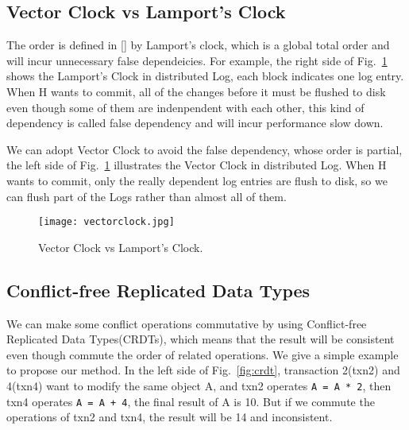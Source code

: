 \subsection{Vector Clock vs Lamport's Clock}
The order is defined in [] by Lamport's clock, which is a global total order and will incur unnecessary false dependeicies. For example, the right side of Fig.~\ref{fig:vectorclock} shows the Lamport's Clock in distributed Log, each block indicates one log entry. When H wants to commit, all of the changes before it must be flushed to disk even though some of them are indenpendent with each other, this kind of dependency is called false dependency and will incur performance slow down.

We can adopt Vector Clock to avoid the false dependency, whose order is partial, the left side of Fig.~\ref{fig:vectorclock} illustrates the Vector Clock in distributed Log. When H wants to commit, only the really dependent log entries are flush to disk, so we can flush part of the Logs rather than almost all of them.
\begin{figure}[htbp]
  \centering
  \texttt{[image: vectorclock.jpg]}\\
  \caption{Vector Clock vs Lamport's Clock.}\label{fig:vectorclock}
\end{figure}

\subsection{Conflict-free Replicated Data Types}
We can make some conflict operations commutative by using Conflict-free Replicated Data Types(CRDTs), which means that the result will be consistent even though commute the order of related operations. We give a simple example to propose our method. In the left side of Fig.~\ref{fig:crdt}, transaction 2(txn2) and 4(txn4) want to modify the same object A, and txn2 operates \texttt{A = A * 2}, then txn4 operates \texttt{A = A + 4}, the final result of A is 10. But if we commute the operations of txn2 and txn4, the result will be 14 and inconsistent. 

